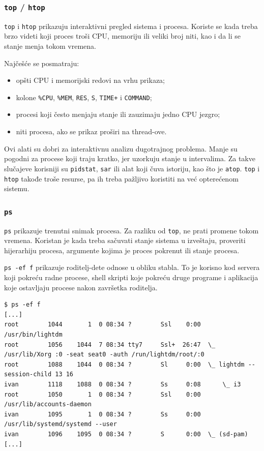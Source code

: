 \subsubsection{\texorpdfstring{\texttt{top} / \texttt{htop}}{top / htop}}\label{top--htop}

\texttt{top} i \texttt{htop} prikazuju interaktivni pregled sistema i procesa. Koriste se kada treba brzo videti koji proces troši CPU, memoriju ili veliki broj niti, kao i da li se stanje menja tokom vremena.

Najčešće se posmatraju:

\begin{itemize}
\tightlist
\item
  opšti CPU i memorijski redovi na vrhu prikaza;
\item
  kolone \texttt{\%CPU}, \texttt{\%MEM}, \texttt{RES}, \texttt{S}, \texttt{TIME+} i \texttt{COMMAND};
\item
  procesi koji često menjaju stanje ili zauzimaju jedno CPU jezgro;
\item
  niti procesa, ako se prikaz proširi na thread-ove.
\end{itemize}

Ovi alati su dobri za interaktivnu analizu dugotrajnog problema. Manje su pogodni za procese koji traju kratko, jer uzorkuju stanje u intervalima. Za takve slučajeve korisniji su \texttt{pidstat}, \texttt{sar} ili alat koji čuva istoriju, kao što je \texttt{atop}. \texttt{top} i \texttt{htop} takođe troše resurse, pa ih treba pažljivo koristiti na već opterećenom sistemu.

\subsubsection{\texorpdfstring{\texttt{ps}}{ps}}\label{ps}

\texttt{ps} prikazuje trenutni snimak procesa. Za razliku od \texttt{top}, ne prati promene tokom vremena. Koristan je kada treba sačuvati stanje sistema u izveštaju, proveriti hijerarhiju procesa, argumente kojima je proces pokrenut ili stanje procesa.

\texttt{ps -ef f} prikazuje roditelj-dete odnose u obliku stabla. To je korisno kod servera koji pokreću radne procese, shell skripti koje pokreću druge programe i aplikacija koje ostavljaju procese nakon završetka roditelja.

\begin{verbatim}
$ ps -ef f
[...]
root        1044       1  0 08:34 ?        Ssl    0:00 /usr/bin/lightdm
root        1056    1044  7 08:34 tty7     Ssl+  26:47  \_ /usr/lib/Xorg :0 -seat seat0 -auth /run/lightdm/root/:0
root        1088    1044  0 08:34 ?        Sl     0:00  \_ lightdm --session-child 13 16
ivan        1118    1088  0 08:34 ?        Ss     0:08      \_ i3
root        1050       1  0 08:34 ?        Ssl    0:00 /usr/lib/accounts-daemon
ivan        1095       1  0 08:34 ?        Ss     0:00 /usr/lib/systemd/systemd --user
ivan        1096    1095  0 08:34 ?        S      0:00  \_ (sd-pam)
[...]
\end{verbatim}

